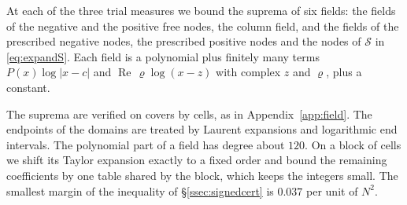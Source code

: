 At each of the three trial measures we bound the suprema of six fields: the fields of the negative and the
positive free nodes, the column field, and the fields of the prescribed negative nodes, the prescribed
positive nodes and the nodes of $\mathcal S$ in \eqref{eq:expandS}. Each field is a polynomial plus finitely many
terms $P(x)\log|x-c|$ and $\operatorname{Re}\,\varrho\log(x-z)$ with complex $z$ and $\varrho$, plus a constant.

The suprema are verified on covers by cells, as in Appendix~\ref{app:field}. The endpoints of the domains are
treated by Laurent expansions and logarithmic end intervals. The polynomial part of a field has degree about
$120$. On a block of cells we shift its Taylor expansion exactly to a fixed order and bound the remaining
coefficients by one table shared by the block, which keeps the integers small. The smallest margin of the
inequality of \S\ref{ssec:signedcert} is $0.037$ per unit of $N^2$.
